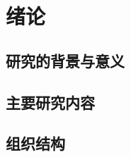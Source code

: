 
\chapter{绪论}
\label{cha:intro}





\section{研究的背景与意义}



\section{主要研究内容}
\label{sec:mainissue}


\section{组织结构}
\label{sec:orgnization}
